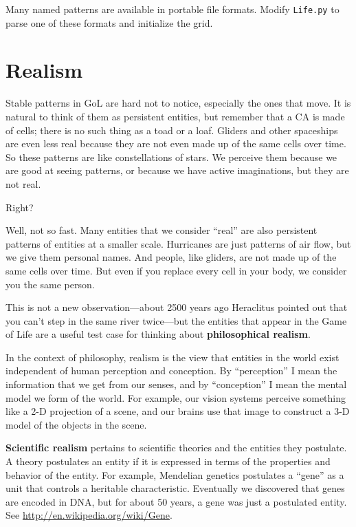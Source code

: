 \documentclass[10pt]{book}
\begin{document}
\begin{exercise}

Many named patterns are available in portable file formats.
Modify {\tt Life.py} to parse one of these formats and initialize
the grid.

\end{exercise}


\section{Realism}

Stable patterns in GoL are hard not to notice, especially the ones
that move.  It is natural to think of them as persistent entities, but
remember that a CA is made of cells; there is no such thing as a toad
or a loaf.  Gliders and other spaceships are even less real because
they are not even made up of the same cells over time.  So these
patterns are like constellations of stars.  We perceive them because
we are good at seeing patterns, or because we have active
imaginations, but they are not real.

Right?

Well, not so fast.  Many entities that we consider ``real'' are also
persistent patterns of entities at a smaller scale.  Hurricanes are
just patterns of air flow, but we give them personal names.  And
people, like gliders, are not made up of the same cells over time.
But even if you replace every cell in your body, we consider you the
same person.

This is not a new observation---about 2500 years ago Heraclitus
pointed out that you can't step in the same river twice---but the
entities that appear in the Game of Life are a useful test case for
thinking about {\bf philosophical realism}.

In the context of philosophy, realism is the view that entities
in the world exist independent of human perception and conception.
By ``perception'' I mean the information that we get from
our senses, and by ``conception'' I mean the mental model
we form of the world.  For example, our vision systems perceive
something like a 2-D projection of a scene, and our brains
use that image to construct a 3-D model of the objects in the
scene.

{\bf Scientific realism} pertains to scientific theories and the
entities they postulate.
A theory postulates an entity if it is
expressed in terms of the properties and behavior of the entity.  For
example, Mendelian genetics postulates a ``gene'' as a unit that
controls a heritable characteristic.  Eventually we discovered that
genes are encoded in DNA, but for about 50 years, a gene was just a
postulated entity.  See \url{http://en.wikipedia.org/wiki/Gene}.
\end{document}
